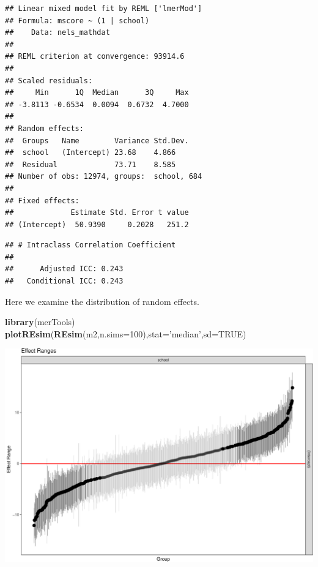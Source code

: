 \documentclass[ignorenonframetext,]{beamer}
\newenvironment{Shaded}{\begin{snugshade}}{\end{snugshade}}
\newcommand{\KeywordTok}[1]{\textcolor[rgb]{0.13,0.29,0.53}{\textbf{#1}}}
\newcommand{\DataTypeTok}[1]{\textcolor[rgb]{0.13,0.29,0.53}{#1}}
\newcommand{\DecValTok}[1]{\textcolor[rgb]{0.00,0.00,0.81}{#1}}
\newcommand{\StringTok}[1]{\textcolor[rgb]{0.31,0.60,0.02}{#1}}
\newcommand{\OtherTok}[1]{\textcolor[rgb]{0.56,0.35,0.01}{#1}}
\newcommand{\NormalTok}[1]{#1}
\begin{document}
\begin{frame}[fragile]{}

\begin{verbatim}
## Linear mixed model fit by REML ['lmerMod']
## Formula: mscore ~ (1 | school)
##    Data: nels_mathdat
## 
## REML criterion at convergence: 93914.6
## 
## Scaled residuals: 
##     Min      1Q  Median      3Q     Max 
## -3.8113 -0.6534  0.0094  0.6732  4.7000 
## 
## Random effects:
##  Groups   Name        Variance Std.Dev.
##  school   (Intercept) 23.68    4.866   
##  Residual             73.71    8.585   
## Number of obs: 12974, groups:  school, 684
## 
## Fixed effects:
##             Estimate Std. Error t value
## (Intercept)  50.9390     0.2028   251.2
\end{verbatim}

\begin{verbatim}
## # Intraclass Correlation Coefficient
## 
##      Adjusted ICC: 0.243
##   Conditional ICC: 0.243
\end{verbatim}

\end{frame}

\begin{frame}[fragile]{}

Here we examine the distribution of random effects.

\begin{Shaded}
\begin{Highlighting}[]
\KeywordTok{library}\NormalTok{(merTools)}
\KeywordTok{plotREsim}\NormalTok{(}\KeywordTok{REsim}\NormalTok{(m2,}\DataTypeTok{n.sims=}\DecValTok{100}\NormalTok{),}\DataTypeTok{stat=}\StringTok{'median'}\NormalTok{,}\DataTypeTok{sd=}\OtherTok{TRUE}\NormalTok{)}
\end{Highlighting}
\end{Shaded}

\end{frame}

\begin{frame}{}

\includegraphics{ancova_01_deck_files/figure-beamer/plotre2-1.pdf}

\end{frame}
\end{document}
